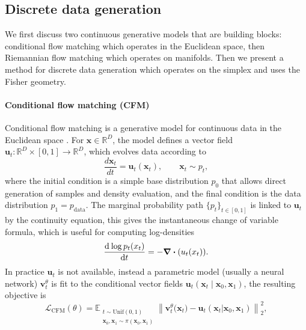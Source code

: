 \subsection{Discrete data generation}


We first discuss two continuous generative models that are building blocks: conditional flow matching which operates in the Euclidean space, then Riemannian flow matching which operates on manifolds. Then we present a method for discrete data generation which operates on the simplex and uses the Fisher geometry. 

\paragraph{Conditional flow matching (CFM)}
Conditional flow matching is a generative model for continuous data in the Euclidean space \citep{Albergo2023,Lipman2023,liu2023flow}. 
For $\boldsymbol{x}\in \mathbb{R}^D$, the model defines a vector field
$\boldsymbol{u}_t:\mathbb{R}^D\times[0,1]\to\mathbb{R}^D$,
which evolves data according to 
\begin{equation}
    \frac{d\boldsymbol{x}_t}{dt}=\boldsymbol{u}_t(\boldsymbol{x}_t), \qquad \boldsymbol{x}_t\sim p_t,
    \label{eq:cfm_ode}
\end{equation}
where the initial condition is a simple base distribution $p_0$ that allows direct generation of samples and density evaluation, and the final condition is the data distribution $p_1=p_{\mathrm{data}}$. The marginal probability path $\{p_t\}_{t\in[0,1]}$ is linked to $\boldsymbol{u}_t$ by the continuity equation, this gives the instantaneous change of variable formula, which is useful for computing log-densities
\begin{equation*}
    \dv[]{\log p_t(x_t)}{t} = - \div(u_t(x_t)).
\end{equation*}
In practice $\boldsymbol{u}_t$ is not available, instead a parametric model (usually a neural network) $\boldsymbol{v}_t^\theta$ is fit to the conditional vector fields $\boldsymbol{u}_t(\boldsymbol{x}_t\mid\boldsymbol{x}_0,\boldsymbol{x}_1)$, the resulting objective is
\begin{equation}
\mathcal{L}_{\mathrm{CFM}}(\theta)
= \mathbb{E}_{\substack{t\sim \mathrm{Unif}(0,1) \\ \boldsymbol{x}_0,\boldsymbol{x}_1\sim\pi(\boldsymbol{x}_0,\boldsymbol{x}_1)}}
  \left\| \boldsymbol{v}^\theta_t\big(\boldsymbol{x}_t\big) - \boldsymbol{u}_t(\boldsymbol{x}_t|\boldsymbol{x}_0,\boldsymbol{x}_1) \right\|_2^2, \label{eq:cfm_loss}
\end{equation}
